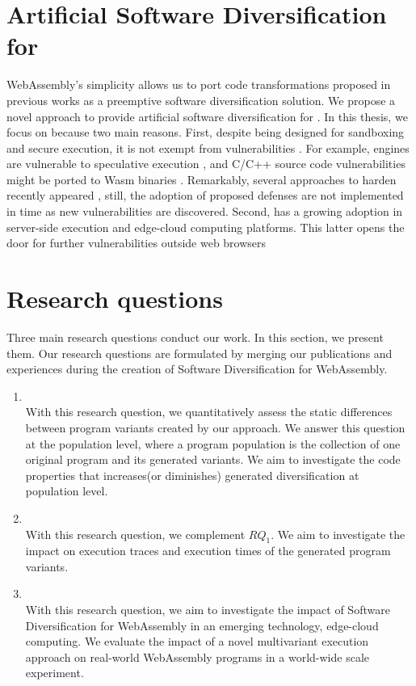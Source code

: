 \section{Artificial Software Diversification for \wasm}


WebAssembly's simplicity allows us to port code transformations proposed in previous works as a preemptive software diversification solution.
We propose a novel approach to provide artificial software diversification for \wasm.
In this thesis, we focus on \wasm because two main reasons. First,
despite being designed for sandboxing and secure execution, it is not exempt from vulnerabilities \cite{WebAssemblySecurity}.
For example, \wasm engines are vulnerable to speculative execution \cite{Narayan2021Swivel}, and C/C++ source code vulnerabilities might be ported to Wasm binaries \cite{DeRoover2022}.  
Remarkably, several approaches to harden \wasm recently appeared \cite{johnson2021}, still, the adoption of proposed defenses are not implemented in time as new vulnerabilities are discovered.
Second, \wasm has a growing adoption in server-side execution and edge-cloud computing platforms.
This latter opens the door for further vulnerabilities outside web browsers

\section{Research questions}
\label{intro:definition:rq}

Three main research questions conduct our work.
In this section, we present them. 
Our research questions are formulated by merging our publications and experiences during the creation of Software Diversification for WebAssembly. 


\begin{enumerate}[label=\subscript{RQ}{{\arabic*}}]
    \item \textbf{\rqone}\\
    With this research question, we quantitatively assess the static differences between program variants created by our approach. We answer this question at the population level, where a program population is the collection of one original program and its generated variants. We aim to investigate the code properties that increases(or diminishes) generated diversification at population level. 

    \item \textbf{\rqtwo} \\
    With this research question, we complement $RQ_1$. We aim to investigate the impact on execution traces and execution times of the generated program variants.

    \item \textbf{\rqthree} \\
    With this research question, we aim to investigate the impact of Software Diversification for WebAssembly in an emerging technology, edge-cloud computing. We evaluate the impact of a novel multivariant execution approach on real-world WebAssembly programs in a world-wide scale experiment.
    
    
\end{enumerate}


